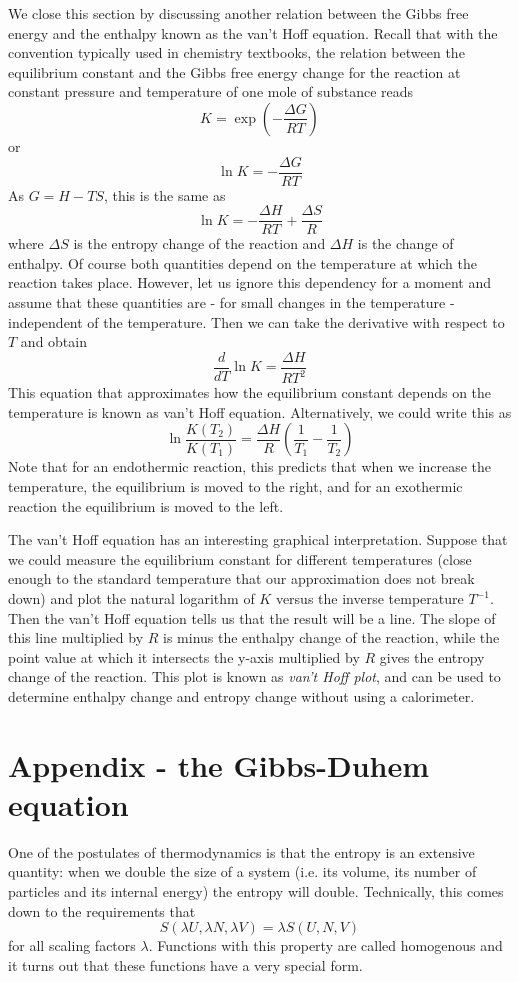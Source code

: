 \documentclass[a4paper, draft]{article}
\theoremstyle{own}
\theoremstyle{remark}
\begin{document}
We close this section by discussing another relation between the Gibbs free energy and the enthalpy known as the van't Hoff equation. Recall that with the convention typically used in chemistry textbooks, the relation between the equilibrium constant and the Gibbs free energy change for the reaction at constant pressure and temperature of one mole of substance reads
$$
K = \exp (- \frac{\Delta G}{R T})
$$
or
$$
\ln K = - \frac{\Delta G}{R T}
$$
As $G = H - TS$, this is the same as
$$
\ln K = - \frac{\Delta H}{R T} + \frac{\Delta S}{R}
$$
where $\Delta S$ is the entropy change of the reaction and $\Delta H$ is the change of enthalpy. Of course both quantities depend on the temperature at which the reaction takes place. However, let us ignore this dependency for a moment and assume that these quantities are - for small changes in the temperature - independent of the temperature. Then we can take the derivative with respect to $T$ and obtain
$$
\frac{d}{dT} \ln K =  \frac{\Delta H}{R T^2} 
$$
This equation that approximates how the equilibrium constant depends on the temperature is known as van't Hoff equation. Alternatively, we could write this as
$$
\ln \frac{K(T_2)}{K(T_1)} =  \frac{\Delta H}{R} (\frac{1}{T_1} - \frac{1}{T_2})
$$
Note that for an endothermic reaction, this predicts that when we increase the temperature, the equilibrium is moved to the right, and for an exothermic reaction the equilibrium is moved to the left. 

The van't Hoff equation has an interesting graphical interpretation. Suppose that we could measure the equilibrium constant for different temperatures (close enough to the standard temperature that our approximation does not break down) and plot the natural logarithm of $K$ versus the inverse temperature $T^{-1}$. Then the van't Hoff equation tells us that the result will be a line. The slope of this line multiplied by $R$ is minus the enthalpy change of the reaction, while the point value at which it intersects the y-axis multiplied by $R$ gives the entropy change of the reaction. This plot is known as {\em van't Hoff plot}, and can be used to determine enthalpy change and entropy change without using a calorimeter.

\section{Appendix - the Gibbs-Duhem equation}

One of the postulates of thermodynamics is that the entropy is an extensive quantity: when we double the size of a system (i.e. its volume, its number of particles and its internal energy) the entropy will double. Technically, this comes down to the requirements that
$$
S(\lambda U, \lambda N, \lambda V ) = \lambda S(U, N, V)
$$
for all scaling factors $\lambda$. Functions with this property are called homogenous and it turns out that these functions have a very special form.
\end{document}
